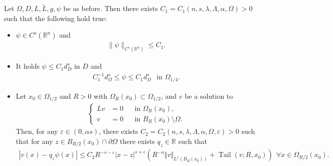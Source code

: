 \documentclass[11pt,reqno]{amsart}
\theoremstyle{plain}
\theoremstyle{definition}
\numberwithin{equation}{section}
\newcommand{\R}{\mathbb{R}}
\newcommand{\eps}{\varepsilon}
\newcommand{\1}{\mathbbm{1}}
\DeclareMathOperator{\tail}{Tail}
\begin{document}
\begin{proposition}
\label{prop:inhom-Cs}
Let $\Omega,D,L,\widetilde{L},g,\psi$ be as before. Then there exists $C_1=C_1(n, s, \lambda, \Lambda, \alpha, \Omega)>0$ such that the following hold true:
\begin{itemize}
\item[(i)] $\psi \in C^s(\R^n)$ and
\begin{align*}
\|\psi\|_{C^s(\R^n)} \le C_1.
\end{align*}
\item[(ii)] It holds $\psi \le C_1 d_D^s$ in $D$ and
\begin{align*}
    C_1^{-1} d_\Omega^s \le \psi \le C_1 d_\Omega^s ~~ \text{ in } \Omega_{1/4}.
\end{align*}
\item[(iii)] Let $x_0 \in \Omega_{1/2}$ and $R > 0$ with $\Omega_R(x_0) \subset \Omega_{1/2}$, and $v$ be a solution to
\begin{align*}
\left\{
\begin{aligned}
Lv&=0 &&\text{in }\Omega_R(x_0), \\
v&=0 &&\text{in }B_R(x_0) \setminus \Omega.
\end{aligned}
\right.
\end{align*}
Then, for any $\eps \in (0,\alpha s)$, there exists $C_2=C_2(n,s,\lambda,\Lambda,\alpha,\Omega,\eps)> 0$ such that
for any $z \in B_{R/2}(x_0) \cap \partial \Omega$ there exists $q_z \in \R$ such that
\begin{align}
\label{eq:expansion-psi}
|v(x) - q_z \psi(x)| \le C_2 R^{-s-\eps} |x-z|^{s+\eps} \left(R^{-n} \Vert v \Vert_{L^1(B_R(x_0))} + \tail(v;R,x_0) \right) ~~ \forall x \in \Omega_{R/2}(x_0).
\end{align}
\end{itemize}
\end{proposition}
\end{document}
